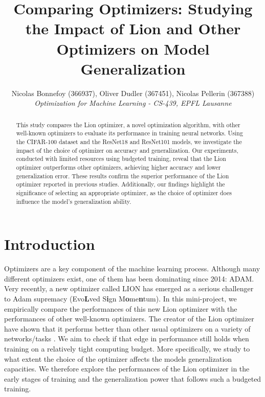 \documentclass[10pt,conference,compsocconf]{IEEEtran}
\begin{document}
\title{Comparing Optimizers: Studying the Impact of Lion and Other Optimizers on Model Generalization}


\author{
  Nicolas Bonnefoy (366937), Oliver Dudler (367451), Nicolas Pellerin (367388)\\
  \textit{Optimization for Machine Learning - CS-439, EPFL Lausanne}
}

\maketitle

\begin{abstract}

  This study compares the Lion optimizer, a novel optimization algorithm, with other well-known optimizers to evaluate its performance in training neural networks. Using the CIFAR-100 dataset and the ResNet18 and ResNet101 models, we investigate the impact of the choice of optimizer on accuracy and generalization. Our experiments, conducted with limited resources using budgeted training, reveal that the Lion optimizer outperforms other optimizers, achieving higher accuracy and lower generalization error. These results confirm the superior performance of the Lion optimizer reported in previous studies. Additionally, our findings highlight the significance of selecting an appropriate optimizer, as the choice of optimizer does influence the model's generalization ability.

\end{abstract}

\section{Introduction}
Optimizers are a key component of the machine learning process. Although many different optimizers exist, one of them has been dominating since 2014: ADAM. Very recently, a new optimizer called LION has emerged as a serious challenger to Adam supremacy \cite{lion} (Evo\textbf{L}ved S\textbf{i}gn M\textbf{o}me\textbf{n}tum). In this mini-project, we empirically compare the performances of this new Lion optimizer with the performances of other well-known optimizers. The creator of the Lion optimizer have shown that it performs better than other usual optimizers on a variety of networks/tasks \cite{lion}. We aim to check if that edge in performance still holds when training on a relatively tight computing budget. More specifically, we study to what extent the choice of the optimizer affects the models generalization capacities. We therefore explore the performances of the Lion optimizer in the early stages of training and the generalization power that follows such a budgeted training.
\end{document}
